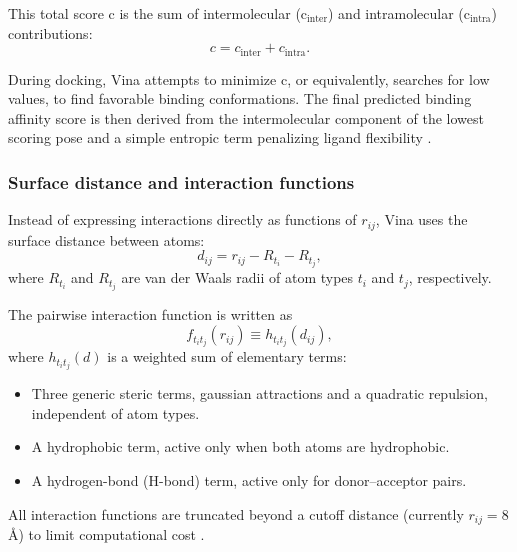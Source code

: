 \documentclass[12pt, a4paper]{article}
\begin{document}
This total score c is the sum of intermolecular ($\text{c}_{\text{inter}}$) and intramolecular ($\text{c}_{\text{intra}}$) contributions:
\[
  c = c_{\text{inter}} + c_{\text{intra}}.
\]

During docking, Vina attempts to minimize c, or equivalently, searches for low values, to find favorable binding conformations.  The final predicted binding affinity score is then derived from the intermolecular component of the lowest scoring pose and a simple entropic term penalizing ligand flexibility \cite{CH7_trott2010vina}.

\subsubsection{Surface distance and interaction functions}

Instead of expressing interactions directly as functions of $r_{ij}$, Vina uses the surface distance between atoms:
\[
  d_{ij} = r_{ij} - R_{t_i} - R_{t_j},
\]
where $R_{t_i}$ and $R_{t_j}$ are van der Waals radii of atom types $t_i$ and $t_j$, respectively.

The pairwise interaction function is written as
\[
  f_{t_i t_j}(r_{ij}) \equiv h_{t_i t_j}(d_{ij}),
\]
where $h_{t_i t_j}(d)$ is a weighted sum of elementary terms:
\begin{itemize}
  \item Three generic steric terms, gaussian attractions and a quadratic repulsion, independent of atom types.
  \item A hydrophobic term, active only when both atoms are hydrophobic.
  \item A hydrogen-bond (H-bond) term, active only for donor–acceptor pairs.
\end{itemize}

All interaction functions are truncated beyond a cutoff distance (currently $r_{ij} = 8$ \r{A}) to limit computational cost \cite{CH7_trott2010vina}.
\end{document}
